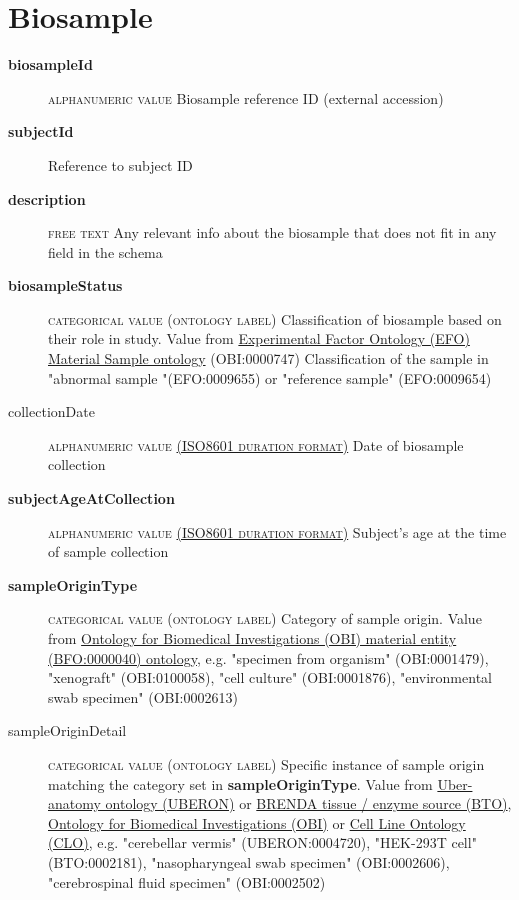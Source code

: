 \documentclass[a4paper, 10pt]{article}        %
\begin{document}
  
  \section*{ {\color{teal} Biosample}}
  
  \begin{description}
	\item[\textbf{biosampleId}]  {\textsc{alphanumeric value}} Biosample reference ID (external accession)
	\item[\textbf{subjectId}] Reference to subject ID
	\item[\textbf{description}]  {\textsc{free text}} Any relevant info about the biosample that does not fit in any field in the schema
	\item[\textbf{biosampleStatus}] {\textsc{categorical value (ontology label)}} Classification of biosample based on their role in study. Value from  \href{https://www.ebi.ac.uk/ols/ontologies/efo/terms?iri=http%3A%2F%2Fpurl.obolibrary.org%2Fobo%2FOBI_0000747&viewMode=All&siblings=false}{Experimental Factor Ontology (EFO) Material Sample ontology} (OBI:0000747) Classification of the sample in "abnormal sample "(EFO:0009655) or "reference sample" (EFO:0009654)
	\item[collectionDate] {\textsc{alphanumeric value \href{https://www.iso.org/iso-8601-date-and-time-format.html}{(ISO8601 duration format)}}} Date of biosample collection
	\item[\textbf{subjectAgeAtCollection}] {\textsc{alphanumeric value \href{https://www.iso.org/iso-8601-date-and-time-format.html}{(ISO8601 duration format)}}} Subject's age at  the time of sample collection
	\item[\textbf{sampleOriginType}] {\textsc{categorical value (ontology label)}} Category of sample origin. Value from \href{http://purl.obolibrary.org/obo/BFO_0000040}{Ontology for Biomedical Investigations (OBI) material entity (BFO:0000040) ontology}, e.g. "specimen from organism" (OBI:0001479), "xenograft" (OBI:0100058), "cell culture" (OBI:0001876), "environmental swab specimen" (OBI:0002613)
	\item[sampleOriginDetail] {\textsc{categorical value (ontology label)}} Specific instance of sample origin matching the category set in \textbf{sampleOriginType}. Value from \href{https://www.ebi.ac.uk/ols/ontologies/uberon}{Uber-anatomy ontology (UBERON)} or \href{https://www.ebi.ac.uk/ols/ontologies/bto}{BRENDA tissue / enzyme source (BTO)}, \href{http://purl.obolibrary.org/obo/BFO_0000040}{Ontology for Biomedical Investigations (OBI)} or \href{www.ebi.ac.uk/ols/ontologies/clo}{Cell Line Ontology (CLO)}, e.g. "cerebellar vermis" (UBERON:0004720), "HEK-293T cell" (BTO:0002181), "nasopharyngeal swab specimen" (OBI:0002606), "cerebrospinal fluid specimen" (OBI:0002502)

\end{description}
\end{document}
